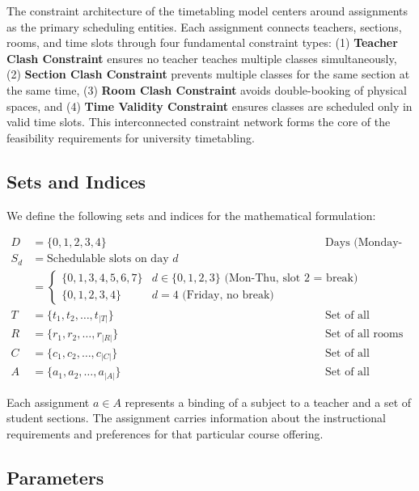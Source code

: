 \documentclass[12pt,a4paper]{article}
\begin{document}
The constraint architecture of the timetabling model centers around assignments as the primary scheduling entities. Each assignment connects teachers, sections, rooms, and time slots through four fundamental constraint types: (1) \textbf{Teacher Clash Constraint} ensures no teacher teaches multiple classes simultaneously, (2) \textbf{Section Clash Constraint} prevents multiple classes for the same section at the same time, (3) \textbf{Room Clash Constraint} avoids double-booking of physical spaces, and (4) \textbf{Time Validity Constraint} ensures classes are scheduled only in valid time slots. This interconnected constraint network forms the core of the feasibility requirements for university timetabling.

\subsection{Sets and Indices}

We define the following sets and indices for the mathematical formulation:

\begin{align*}
D &= \{0, 1, 2, 3, 4\} && \text{Days (Monday-Friday)} \\
S_d &= \text{Schedulable slots on day } d && \\
&= \begin{cases}
\{0,1,3,4,5,6,7\} & d \in \{0,1,2,3\} \text{ (Mon-Thu, slot 2 = break)} \\
\{0,1,2,3,4\} & d = 4 \text{ (Friday, no break)}
\end{cases} \\
T &= \{t_1, t_2, \ldots, t_{|T|}\} && \text{Set of all teachers} \\
R &= \{r_1, r_2, \ldots, r_{|R|}\} && \text{Set of all rooms} \\
C &= \{c_1, c_2, \ldots, c_{|C|}\} && \text{Set of all sections} \\
A &= \{a_1, a_2, \ldots, a_{|A|}\} && \text{Set of all assignments}
\end{align*}

Each assignment $a \in A$ represents a binding of a subject to a teacher and a set of student sections. The assignment carries information about the instructional requirements and preferences for that particular course offering.

\subsection{Parameters}
\end{document}
